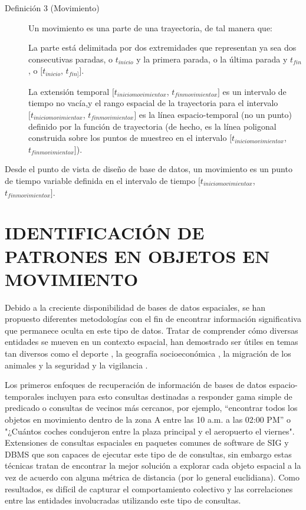 \begin{description}
 \item [Definición 3 (Movimiento)] Un movimiento es una parte de una trayectoria, de tal manera que:

La parte está delimitada por dos extremidades que representan ya sea dos consecutivas paradas, o 
$t_{inicio}$ y la primera parada, o la última parada y $t_{fin}$, o $[t_{inicio}$, $t_{fin]}]$.

La extensión temporal $[t_{iniciomovimientox}$, $t_{finmovimientox}]$ es un intervalo de tiempo no vacía,y el 
rango espacial de la trayectoria para el intervalo $[t_{iniciomovimientox}$, $t_{finmovimientox}]$ es la línea 
espacio-temporal (no un punto) definido por la función de trayectoria (de hecho, es la línea poligonal 
construida sobre los puntos de muestreo en el intervalo $[t_{iniciomovimientox}$, $t_{finmovimientox}]$).
\end{description}


Desde el punto de vista de diseño de base de datos, un movimiento es un punto de tiempo variable 
definida en el intervalo de tiempo $[t_{iniciomovimientox}$, $t_{finmovimientox}]$. \cite{spaccapietra2008conceptual}

\section{IDENTIFICACIÓN DE PATRONES EN OBJETOS EN MOVIMIENTO}

Debido a la creciente disponibilidad de bases de datos espaciales, se han propuesto diferentes 
metodologías con el fin de encontrar información significativa que permanece oculta en este tipo de 
datos. Tratar de comprender cómo diversas entidades se mueven en un contexto espacial,  han 
demostrado ser útiles en temas tan diversos como el deporte \cite{iwase2004parallel}, la geografía 
socioeconómica \cite{frank2001life}, la migración de los animales \cite{dettki2004real} y la 
seguridad y la vigilancia \cite{makris2002path} \cite{piciarelli2006trajectory}. 

Los primeros enfoques de recuperación de información de bases de datos 
espacio-temporales incluyen para esto consultas destinadas a responder gama simple de predicado o 
consultas de vecinos más cercanos, por 
ejemplo, ``encontrar todos los objetos en movimiento dentro de la zona A entre las 10 a.m. a 
las 02:00 PM''  o "¿Cuántos coches condujeron entre la plaza principal y el aeropuerto el viernes". 
Extensiones de consultas espaciales en  paquetes comunes de software de SIG
y DBMS que son capaces de ejecutar este tipo de de consultas, sin embargo estas técnicas tratan de 
encontrar la mejor solución a explorar cada objeto espacial 
 a la vez de acuerdo con alguna métrica de distancia (por lo general euclidiana). Como 
resultados, es difícil de capturar el comportamiento colectivo y las correlaciones entre las 
entidades involucradas utilizando este tipo de consultas. 

